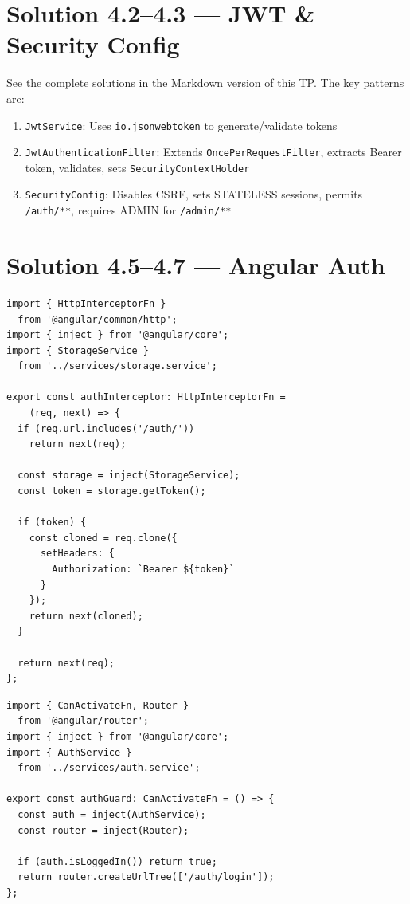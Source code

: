 \documentclass[12pt,a4paper]{report}
\begin{document}
\section{Solution 4.2--4.3 --- JWT \& Security Config}

See the complete solutions in the Markdown version of this TP. The key patterns are:

\begin{enumerate}
    \item \texttt{JwtService}: Uses \texttt{io.jsonwebtoken} to generate/validate tokens
    \item \texttt{JwtAuthenticationFilter}: Extends \texttt{OncePerRequestFilter}, extracts Bearer token, validates, sets \texttt{SecurityContextHolder}
    \item \texttt{SecurityConfig}: Disables CSRF, sets STATELESS sessions, permits \texttt{/auth/**}, requires ADMIN for \texttt{/admin/**}
\end{enumerate}

\section{Solution 4.5--4.7 --- Angular Auth}

\begin{lstlisting}[style=tsstyle, title={core/interceptors/auth.interceptor.ts}]
import { HttpInterceptorFn }
  from '@angular/common/http';
import { inject } from '@angular/core';
import { StorageService }
  from '../services/storage.service';

export const authInterceptor: HttpInterceptorFn =
    (req, next) => {
  if (req.url.includes('/auth/'))
    return next(req);

  const storage = inject(StorageService);
  const token = storage.getToken();

  if (token) {
    const cloned = req.clone({
      setHeaders: {
        Authorization: `Bearer ${token}`
      }
    });
    return next(cloned);
  }

  return next(req);
};
\end{lstlisting}

\begin{lstlisting}[style=tsstyle, title={core/guards/auth.guard.ts}]
import { CanActivateFn, Router }
  from '@angular/router';
import { inject } from '@angular/core';
import { AuthService }
  from '../services/auth.service';

export const authGuard: CanActivateFn = () => {
  const auth = inject(AuthService);
  const router = inject(Router);

  if (auth.isLoggedIn()) return true;
  return router.createUrlTree(['/auth/login']);
};
\end{lstlisting}
\end{document}

